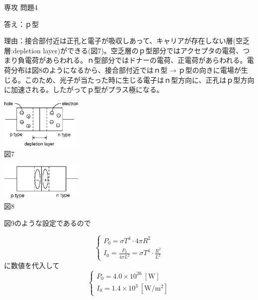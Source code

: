 \documentclass[fleqn]{jbook}
\begin{document}
\begin{answer}{専攻 問題4}{}
\begin{subanswers}
\SubAnswer
\begin{subsubanswers}
\SubSubAnswer
答え：ｐ型\\
\begin{minipage}{.5\linewidth}
理由：接合部付近は正孔と電子が吸収しあって、キャリアが存在しない層(空乏層:depletion layer)ができる(図7)。空乏層のｐ型部分ではアクセプタの電荷、つまり負電荷があらわれる。ｎ型部分ではドナーの電荷、正電荷があらわれる。電荷分布は図8のようになるから、接合部付近ではｎ型$\rightarrow$ｐ型の向きに電場が生じる。このため、光子が当たった時に生じる電子はｎ型方向に、正孔はｐ型方向に加速される。したがってｐ型がプラス極になる。
\end{minipage}
\hspace{.1\linewidth}
\begin{minipage}{.4\linewidth}
\begin{center}
\includegraphics[clip,width=4cm]{1999phy4-7.eps}\\
図7
\end{center}
\begin{center}
\includegraphics[clip,width=4cm]{1999phy4-8.eps}\\
図8
\end{center}
\end{minipage}

\SubSubAnswer
図9のような設定であるので\\
\begin{minipage}{.4\linewidth}
\[
\left\{
\begin{array}{l}
P_0 = \sigma T^4 \cdot 4 \pi R^2 \\
I_0 = \frac{P_0}{4 \pi L^2} = \sigma T^4 \cdot \frac{R^2}{L^2}
\end{array}
\right.
\]
に数値を代入して
\[
\left\{
\begin{array}{l}
P_0 = 4.0 \times 10^{26} \ \mathrm{[W]} \\
I_0 = 1.4 \times 10^3 \ \mathrm{[W/m^2]}
\end{array}
\right.
\]


\end{minipage}
\end{subsubanswers}
\end{subanswers}
\end{answer}
\end{document}
